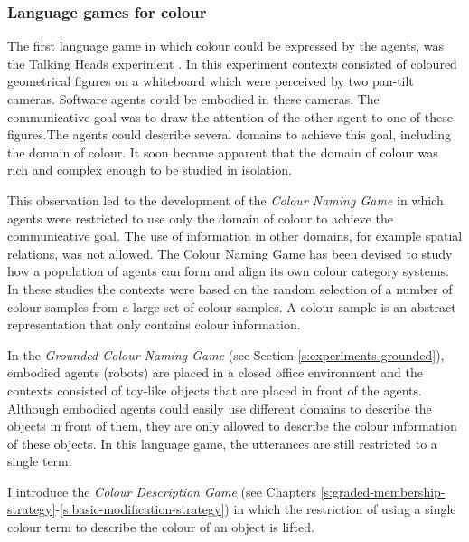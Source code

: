 \subsubsection{Language games for colour}
\label{s:language-games-for-colour}

The first language game in which colour could be expressed by the
agents, was the Talking Heads experiment
\citep{steels99talking}. In this experiment contexts consisted
of coloured geometrical figures on a whiteboard which were perceived
by two pan-tilt cameras. Software agents could be embodied in these
cameras. The communicative goal was to draw the attention of the other
agent to one of these figures.The agents could describe several
domains to achieve this goal, including the domain of colour. It soon
became apparent that the domain of colour was rich and complex enough
to be studied in isolation.

This observation led to the development of the \emph{Colour Naming
  Game} \citep{steels05coordinating,
  belpaeme05explaining, belpaeme07language, puglisi08cultural,
  baronchelli10modeling} in which agents were restricted to use only
the domain of colour to achieve the communicative goal. The use of
information in other domains, for example spatial relations, was not
allowed. The Colour Naming Game has been devised to study how a
population of agents can form and align its own colour category
systems. In these studies the contexts were based on the random
selection of a number of colour samples from a large set of
colour samples. A colour sample is an abstract representation that
only contains colour information.

In the \emph{Grounded Colour Naming Game} (see Section \ref{s:experiments-grounded}),
embodied agents (robots) are placed in a closed office environment and
the contexts consisted of toy-like objects that are placed in front of
the agents. Although embodied agents could easily use different
domains to describe the objects in front of them, they are only
allowed to describe the colour information of these objects. In this
language game, the utterances are still restricted to a single term.

I introduce the \emph{Colour Description Game} (see Chapters
\ref{s:graded-membership-strategy}-\ref{s:basic-modification-strategy})
in which the restriction of using a single colour term to describe the
colour of an object is lifted.

